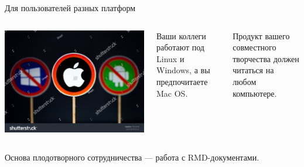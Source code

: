 \documentclass[
  10pt,
  ignorenonframetext,
  aspectratio=169,t,xcolor=table]{beamer}
\newcommand{\columnsbegin}{\vspace{-0.5\baselineskip}\begin{columns}[t,onlytextwidth]}
\newcommand{\columnsend}{\end{columns}}
\begin{document}
\begin{frame}{Для пользователей разных платформ}
\protect\hypertarget{ux434ux43bux44f-ux43fux43eux43bux44cux437ux43eux432ux430ux442ux435ux43bux435ux439-ux440ux430ux437ux43dux44bux445-ux43fux43bux430ux442ux444ux43eux440ux43c}{}
\columnsbegin
{}

\includegraphics[height=0.6\textheight,keepaspectratio]{./images/stock-photo-moscow-russia-december-road-signs-with-top-brand-operating-system-logos-android-mac-770756293.jpg}


Ваши коллеги работают под Linux и Windows, а вы предпочитаете Mac OS.

Продукт вашего совместного творчества должен читаться на любом
компьютере.

\columnsend

\centering

Основа плодотворного сотрудничества --- работа с RMD-документами.
\end{frame}
\end{document}
